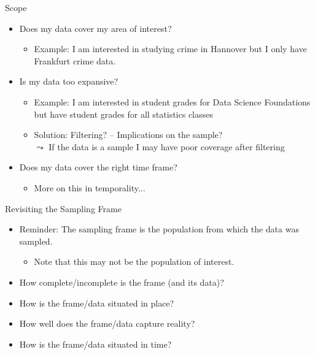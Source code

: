 \documentclass[aspectratio=169]{../latex_main/tntbeamer}  %
\begin{document}
\begin{frame}[c]{Scope}
    \begin{itemize}
        \item  Does my data cover my area of interest?
        \begin{itemize}
            \item Example: I am interested in studying crime in Hannover but I only have Frankfurt crime data.
        \end{itemize}
        \pause
        \item  Is my data too expansive?
        \begin{itemize}
            \item Example: I am interested in student grades for Data Science Foundations but have student grades for all statistics classes
            \item Solution: Filtering? -- Implications on the sample?\\
            $\leadsto$ If the data is a sample I may have poor coverage after filtering
        \end{itemize}
        \pause
        \item Does my data cover the right time frame?
        \begin{itemize}
            \item  More on this in temporality...
        \end{itemize}
    \end{itemize}

\end{frame}


\begin{frame}[c]{Revisiting the Sampling Frame}
    \begin{itemize}
        \item \alert{Reminder:} The sampling frame is the population from which the data was sampled.
        \begin{itemize}
            \item Note that this may not be the population of interest.
        \end{itemize}
        \item How complete/incomplete is the frame (and its data)?
        \item How is the frame/data situated in place?
        \item How well does the frame/data capture reality?
        \item How is the frame/data situated in time?
    \end{itemize}
\end{frame}
\end{document}
